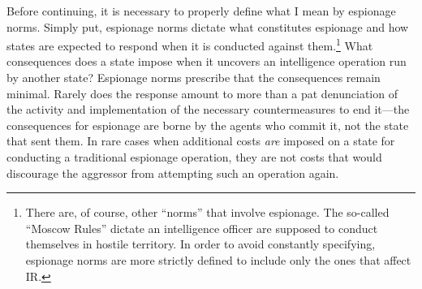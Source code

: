 \documentclass[14pt]{extarticle}
\begin{document}
Before continuing, it is necessary to properly define what I mean by espionage norms. Simply put, espionage norms dictate what constitutes espionage and how states are expected to respond when it is conducted against them.\footnote{There are, of course, other \enquote{norms} that involve espionage. The so-called \enquote{Moscow Rules} dictate an intelligence officer are supposed to conduct themselves in hostile territory. In order to avoid constantly specifying, espionage norms are more strictly defined to include only the ones that affect IR.} What consequences does a state impose when it uncovers an intelligence operation run by another state? Espionage norms prescribe that the consequences remain minimal. Rarely does the response amount to more than a pat denunciation of the activity and implementation of the necessary countermeasures to end it---the consequences for espionage are borne by the agents who commit it, not the state that sent them. In rare cases when additional costs \emph{are} imposed on a state for conducting a traditional espionage operation, they are not costs that would discourage the aggressor from attempting such an operation again.
\end{document}
